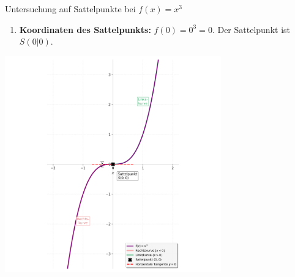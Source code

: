\begin{beispielumgebung}{Untersuchung auf Sattelpunkte bei \texorpdfstring{$f(x) = x^3$}{f(x) = x hoch 3}}
\begin{enumerate}
    \item \textbf{Koordinaten des Sattelpunkts:}
        $f(0) = 0^3 = 0$.
        Der Sattelpunkt ist $S(0|0)$.
\end{enumerate}
\begin{center}
    \includegraphics[width=0.7\textwidth]{grafiken/Sattelpunkt_xhoch3.png}
    \label{fig:sattelpunkt_x3}
\end{center}
\end{beispielumgebung}

